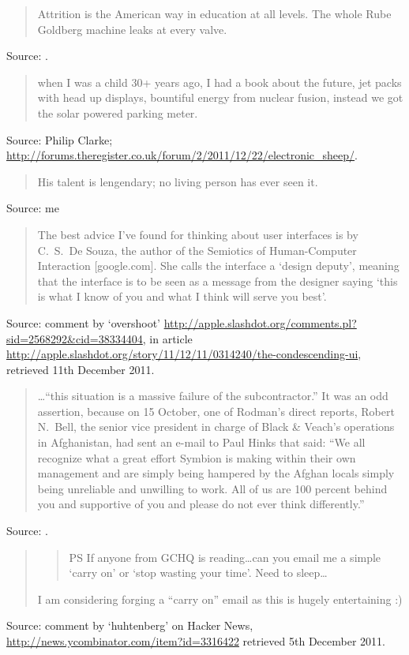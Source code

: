 \documentclass[a4paper]{article}
\begin{document}
\begin{quote}
	Attrition is the American way in education at all levels.  The whole Rube Goldberg machine
	leaks at every valve.
\end{quote}
Source: \citet{Grafton2011}.
\medskip

\begin{quote}
	when I was a child 30+ years ago, I had a book about the future, jet packs with head up
displays, bountiful energy from nuclear fusion, instead we got the solar powered parking meter.
\end{quote}
Source: Philip Clarke; \url{http://forums.theregister.co.uk/forum/2/2011/12/22/electronic_sheep/}.
\medskip

\begin{quote}
	His talent is lengendary; no living person has ever seen it.
\end{quote}
Source: me
\medskip

\begin{quote}
	The best advice I've found for thinking about user interfaces is by C.\ S.\ De Souza, the
	author of the Semiotics of Human-Computer Interaction [google.com].  She calls the interface
	a `design deputy', meaning that the interface is to be seen as a message from the designer
	saying `this is what I know of you and what I think will serve you best'.
\end{quote}
Source: comment by `overshoot' \url{http://apple.slashdot.org/comments.pl?sid=2568292&cid=38334404},
in article \url{http://apple.slashdot.org/story/11/12/11/0314240/the-condescending-ui}, retrieved
11th December 2011.
\medskip

\begin{quote}
	\ldots``this situation is a massive failure of the subcontractor.''  It was an
	odd assertion, because on 15 October, one of Rodman's direct reports, Robert N.\ Bell,
	the senior vice president in charge of Black \& Veach's operations in Afghanistan, had
	sent an e-mail to Paul Hinks that said: ``We all recognize what a great effort Symbion
	is making within their own management and are simply being hampered by the Afghan locals
	simply being unreliable and unwilling to work.  All of us are 100 percent behind you and
	supportive of you and please do not ever think differently.''
	\end{quote}
Source: \citet[p.\ 39]{Zorpette2011}.
\medskip

\begin{quote}
	\begin{quote}
		PS If anyone from GCHQ is reading\ldots can you email me a simple `carry on' or `stop
		wasting your time'.  Need to sleep\ldots
	\end{quote}
	I am considering forging a ``carry on'' email as this is hugely entertaining :)
\end{quote}
Source: comment by `huhtenberg' on Hacker News, \url{http://news.ycombinator.com/item?id=3316422}
		retrieved 5th December 2011.
\medskip
\end{document}
